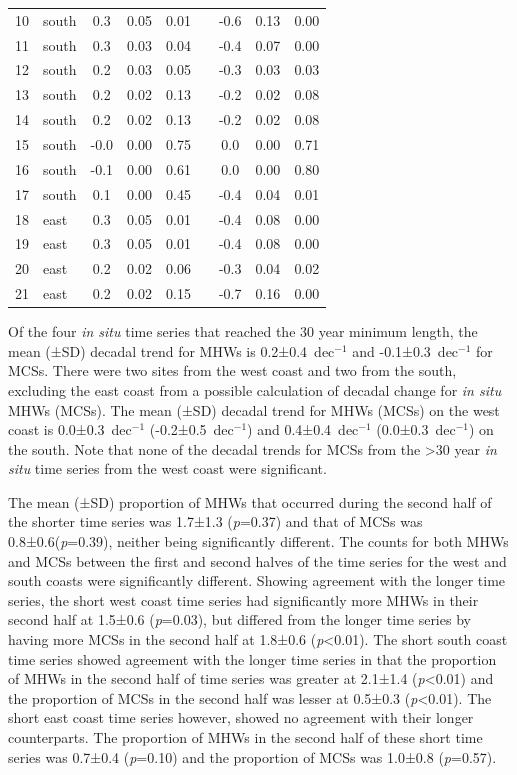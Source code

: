 \documentclass[a4paper,10pt,review]{elsarticle}
\begin{document}
\begin{table}[]
\begin{tiny}
\begin{tabular}{llccccccc}
  10 & south & 0.3 & 0.05 & 0.01 && -0.6 & 0.13 & 0.00 \\
  11 & south & 0.3 & 0.03 & 0.04 && -0.4 & 0.07 & 0.00 \\
  12 & south & 0.2 & 0.03 & 0.05 && -0.3 & 0.03 & 0.03 \\
  13 & south & 0.2 & 0.02 & 0.13 && -0.2 & 0.02 & 0.08 \\
  14 & south & 0.2 & 0.02 & 0.13 && -0.2 & 0.02 & 0.08 \\
  15 & south & -0.0 & 0.00 & 0.75 && 0.0 & 0.00 & 0.71 \\
  16 & south & -0.1 & 0.00 & 0.61 && 0.0 & 0.00 & 0.80 \\
  17 & south & 0.1 & 0.00 & 0.45 && -0.4 & 0.04 & 0.01 \\
  18 & east & 0.3 & 0.05 & 0.01 && -0.4 & 0.08 & 0.00 \\
  19 & east & 0.3 & 0.05 & 0.01 && -0.4 & 0.08 & 0.00 \\
  20 & east & 0.2 & 0.02 & 0.06 && -0.3 & 0.04 & 0.02 \\
  21 & east & 0.2 & 0.02 & 0.15 && -0.7 & 0.16 & 0.00 \\
\bottomrule
\end{tabular}
\end{tiny}
\end{table}

Of the four \emph{in situ} time series that reached the 30 year minimum length, the mean (±SD) decadal trend for MHWs is 0.2±0.4~dec$^{-1}$ and -0.1±0.3~dec$^{-1}$ for MCSs. There were two sites from the west coast and two from the south, excluding the east coast from a possible calculation of decadal change for \emph{in situ} MHWs (MCSs). The mean (±SD) decadal trend for MHWs (MCSs) on the west coast is 0.0±0.3~dec$^{-1}$ (-0.2±0.5~dec$^{-1}$) and 0.4±0.4~dec$^{-1}$ (0.0±0.3~dec$^{-1}$) on the south. Note that none of the decadal trends for MCSs from the >30 year \emph{in situ} time series from the west coast were significant.

The mean (±SD) proportion of MHWs that occurred during the second half of the shorter time series was 1.7±1.3 (\emph{p}=0.37) and that of MCSs was 0.8±0.6(\emph{p}=0.39), neither being significantly different. The counts for both MHWs and MCSs between the first and second halves of the time series for the west and south coasts were significantly different. Showing agreement with the longer time series, the short west coast time series had significantly more MHWs in their second half at 1.5±0.6 (\emph{p}=0.03), but differed from the longer time series by having more MCSs in the second half at 1.8±0.6 (\emph{p}<0.01). The short south coast time series showed agreement with the longer time series in that the proportion of MHWs in the second half of time series was greater at 2.1±1.4 (\emph{p}<0.01) and the proportion of MCSs in the second half was lesser at 0.5±0.3 (\emph{p}<0.01). The short east coast time series however, showed no agreement with their longer counterparts. The proportion of MHWs in the second half of these short time series was 0.7±0.4 (\emph{p}=0.10) and the proportion of MCSs was 1.0±0.8 (\emph{p}=0.57).
\end{document}

